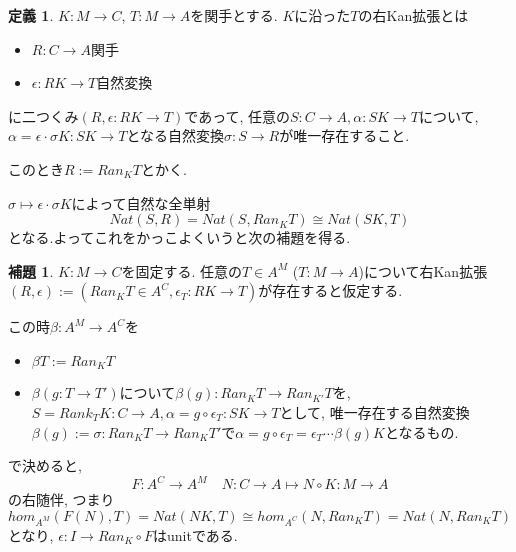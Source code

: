 \documentclass[dvipdfmx,a4paper,11pt]{article}
\theoremstyle{definition}
\newtheorem{lem}[thm]{補題}
\newtheorem{dfn}[thm]{定義}
\begin{document}
 \begin{tcolorbox}
 [colback = white, colframe = green!35!black, fonttitle = \bfseries,breakable = true]
\begin{dfn}
$K : M \to C$, $T : M \to A$を関手とする.
$K$に沿った$T$の右Kan拡張とは
\begin{itemize}
\item $R : C \to A$関手
\item $\epsilon : RK \to T$自然変換
\end{itemize}
に二つくみ$(R, \epsilon : RK \to T)$であって, 
任意の$S : C \to A, \alpha : SK \to T$について, $\alpha = \epsilon \cdot \sigma K : SK \to T$となる自然変換$\sigma : S \to R$が唯一存在すること. 

このとき$R := Ran_{K}T$とかく. 
\end{dfn}
\end{tcolorbox}

$\sigma \mapsto \epsilon \cdot \sigma K$によって自然な全単射
$$
Nat (S, R)=Nat (S, Ran_{K}T) \cong Nat(SK,T)
$$
となる.よってこれをかっこよくいうと次の補題を得る. 
 \begin{tcolorbox}
 [colback = white, colframe = green!35!black, fonttitle = \bfseries,breakable = true]
\begin{lem}
$K : M \to C$を固定する. 
任意の$T \in A^{M}$ ($T : M \to A$)について右Kan拡張
$(R , \epsilon) := (Ran_{K}T \in A^C, \epsilon_T : RK \to T)$が存在すると仮定する.

この時$\beta : A^M \to A^C$を
\begin{itemize}
\item $\beta T := Ran_{K}T$
\item $\beta (g : T \to T')$について$\beta(g) : Ran_{K}T \to Ran_{K'}T$を, $S = Rank_{T}K :C \to A, \alpha =g\circ \epsilon_T : SK \to T$として, 唯一存在する自然変換
$\beta(g):=\sigma :  Ran_{K}T \to Ran_{K}T'$で$\alpha =g\circ \epsilon_T  = \epsilon_T \cdots \beta(g)K$となるもの. 
\end{itemize}
で決めると, 
$$
F : A^C \to A^M \quad N :C\to A\mapsto N \circ K : M \to A 
$$
の右随伴, つまり
$$
hom_{A^M}(F(N), T) = Nat(NK,T)\cong hom_{A^C}(N, Ran_{K}T)=Nat (N, Ran_{K}T)
$$
となり, $\epsilon :  I \to Ran_{K} \circ F$はunitである. 
\end{lem}
\end{tcolorbox}
\end{document}
